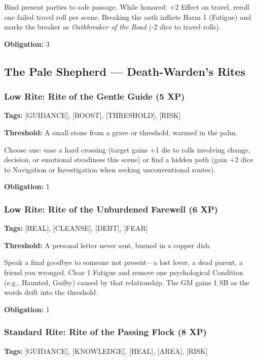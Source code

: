 Bind present parties to safe passage. While honored: +2 Effect on travel, reroll one failed travel roll per scene. Breaking the oath inflicts Harm 1 (Fatigue) and marks the breaker as \textit{Oathbreaker of the Road} (-2 dice to travel rolls).

\textbf{Obligation:} 3

\subsection{The Pale Shepherd — Death-Warden's Rites}

\subsubsection{Low Rite: Rite of the Gentle Guide (5 XP)}

\textbf{Tags:} [GUIDANCE], [BOOST], [THRESHOLD], [RISK]

\textbf{Threshold:} A small stone from a grave or threshold, warmed in the palm.

Choose one: ease a hard crossing (target gains +1 die to rolls involving change, decision, or emotional steadiness this scene) or find a hidden path (gain +2 dice to Navigation or Investigation when seeking unconventional routes).

\textbf{Obligation:} 1

\subsubsection{Low Rite: Rite of the Unburdened Farewell (6 XP)}

\textbf{Tags:} [HEAL], [CLEANSE], [DEBT], [FEAR]

\textbf{Threshold:} A personal letter never sent, burned in a copper dish.

Speak a final goodbye to someone not present—a lost lover, a dead parent, a friend you wronged. Clear 1 Fatigue and remove one psychological Condition (e.g., Haunted, Guilty) caused by that relationship. The GM gains 1 SB as the words drift into the threshold.

\textbf{Obligation:} 1

\subsubsection{Standard Rite: Rite of the Passing Flock (8 XP)}

\textbf{Tags:} [GUIDANCE], [KNOWLEDGE], [HEAL], [AREA], [RISK]

